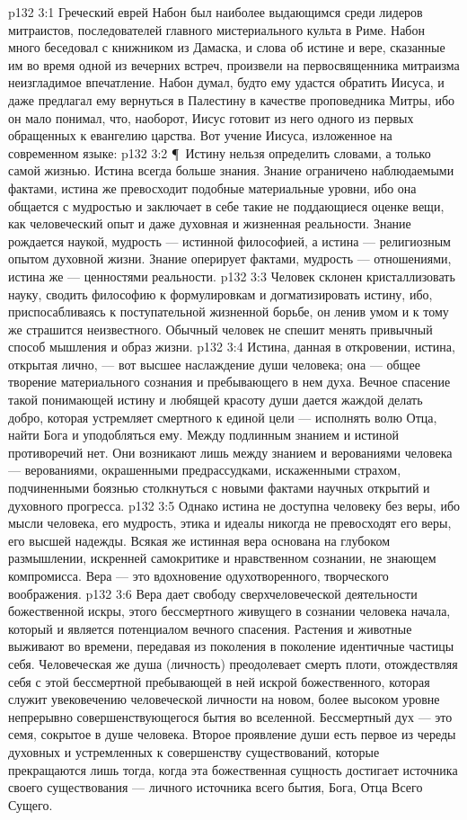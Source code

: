 \vs p132 3:1 Греческий еврей Набон был наиболее выдающимся среди лидеров митраистов, последователей главного мистериального культа в Риме. Набон много беседовал с книжником из Дамаска, и слова об истине и вере, сказанные им во время одной из вечерних встреч, произвели на первосвященника митраизма неизгладимое впечатление. Набон думал, будто ему удастся обратить Иисуса, и даже предлагал ему вернуться в Палестину в качестве проповедника Митры, ибо он мало понимал, что, наоборот, Иисус готовит из него одного из первых обращенных к евангелию царства. Вот учение Иисуса, изложенное на современном языке:
\vs p132 3:2 \P\ Истину нельзя определить словами, а только самой жизнью. Истина всегда больше знания. Знание ограничено наблюдаемыми фактами, истина же превосходит подобные материальные уровни, ибо она общается с мудростью и заключает в себе такие не поддающиеся оценке вещи, как человеческий опыт и даже духовная и жизненная реальности. Знание рождается наукой, мудрость --- истинной философией, а истина --- религиозным опытом духовной жизни. Знание оперирует фактами, мудрость --- отношениями, истина же --- ценностями реальности.
\vs p132 3:3 Человек склонен кристаллизовать науку, сводить философию к формулировкам и догматизировать истину, ибо, приспосабливаясь к поступательной жизненной борьбе, он ленив умом и к тому же страшится неизвестного. Обычный человек не спешит менять привычный способ мышления и образ жизни.
\vs p132 3:4 Истина, данная в откровении, истина, открытая лично, --- вот высшее наслаждение души человека; она --- общее творение материального сознания и пребывающего в нем духа. Вечное спасение такой понимающей истину и любящей красоту души дается жаждой делать добро, которая устремляет смертного к единой цели --- исполнять волю Отца, найти Бога и уподобляться ему. Между подлинным знанием и истиной противоречий нет. Они возникают лишь между знанием и верованиями человека --- верованиями, окрашенными предрассудками, искаженными страхом, подчиненными боязнью столкнуться с новыми фактами научных открытий и духовного прогресса.
\vs p132 3:5 Однако истина не доступна человеку без веры, ибо мысли человека, его мудрость, этика и идеалы никогда не превосходят его веры, его высшей надежды. Всякая же истинная вера основана на глубоком размышлении, искренней самокритике и нравственном сознании, не знающем компромисса. Вера --- это вдохновение одухотворенного, творческого воображения.
\vs p132 3:6 Вера дает свободу сверхчеловеческой деятельности божественной искры, этого бессмертного живущего в сознании человека начала, который и является потенциалом вечного спасения. Растения и животные выживают во времени, передавая из поколения в поколение идентичные частицы себя. Человеческая же душа (личность) преодолевает смерть плоти, отождествляя себя с этой бессмертной пребывающей в ней искрой божественного, которая служит увековечению человеческой личности на новом, более высоком уровне непрерывно совершенствующегося бытия во вселенной. Бессмертный дух --- это семя, сокрытое в душе человека. Второе проявление души есть первое из череды духовных и устремленных к совершенству существований, которые прекращаются лишь тогда, когда эта божественная сущность достигает источника своего существования --- личного источника всего бытия, Бога, Отца Всего Сущего.

